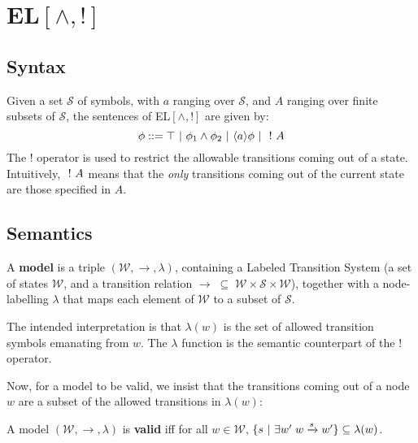 \section{EL$[\land, !]$}

\subsection{Syntax}
Given a set $\mathcal{S}$ of symbols, with $a$ ranging over $\mathcal{S}$, and $A$ ranging over finite subsets of $\mathcal{S}$, the sentences of EL$[\land, !]$ are given by:
\[
\phi ::= \top \ | \  \phi_1 \land \phi_2  \ | \  \langle a \rangle \phi \ | \  \ ! \  A 
\]
The $!$ operator is used to restrict the allowable transitions coming out of a state.
Intuitively, $\ ! \  A$ means that the \emph{only} transitions coming out of the current state are those specified in $A$.
\subsection{Semantics}
\begin{definition}
A {\bf model} is a triple $(\mathcal{W}, \rightarrow, \lambda)$, containing a Labeled Transition System (a set of states $\mathcal{W}$, and a transition relation $\rightarrow \; \subseteq \; \mathcal{W} \times \mathcal{S} \times \mathcal{W}$), together with a node-labelling $\lambda$ that maps each element of $\mathcal{W}$ to a subset of $\mathcal{S}$. 
\end{definition}
The intended interpretation is that $\lambda(w)$ is the set of allowed transition symbols emanating from $w$.
The $\lambda$ function is the semantic counterpart of the $!$ operator.

Now, for a model to be valid, we insist that the transitions coming out of a node $w$ are a subset of the allowed transitions in $\lambda(w)$:
\begin{definition}
A model $(\mathcal{W}, \rightarrow, \lambda)$ is {\bf valid} iff for all $w \in \mathcal{W}$, $ \{s \ | \  \exists w' \; w \xrightarrow{s} w'\} \subseteq \lambda(w)$.
\end{definition}


